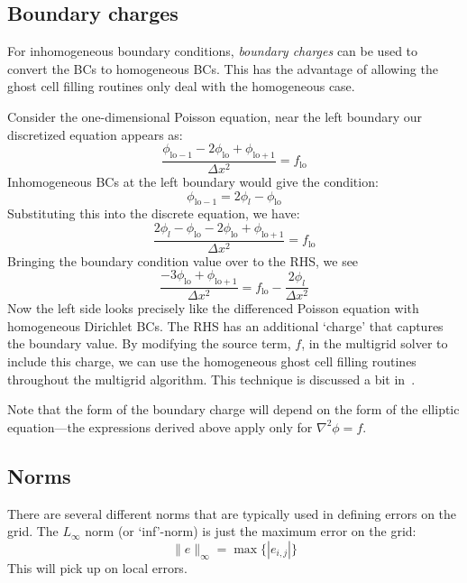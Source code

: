 \subsection{Boundary charges}

For inhomogeneous boundary conditions, {\em boundary charges} can be
used to convert the BCs to homogeneous BCs.  This has the advantage of
allowing the ghost cell filling routines only deal with the
homogeneous case.

Consider the one-dimensional Poisson equation, near the left boundary
our discretized equation appears as:
\begin{equation}
\frac{\phi_\mathrm{lo-1} - 2\phi_\mathrm{lo} + \phi_\mathrm{lo+1}}{\Delta x^2}
 = f_\mathrm{lo}
\end{equation}
Inhomogeneous BCs at the left boundary would give the condition:
\begin{equation}
\phi_\mathrm{lo-1} = 2 \phi_l - \phi_\mathrm{lo}
\end{equation}
Substituting this into the discrete equation, we have:
\begin{equation}
\frac{2 \phi_l - \phi_\mathrm{lo} - 2\phi_\mathrm{lo} + \phi_\mathrm{lo+1}}{\Delta x^2}
 = f_\mathrm{lo}
\end{equation}
Bringing the boundary condition value over to the RHS, we see
\begin{equation}
\frac{- 3\phi_\mathrm{lo} + \phi_\mathrm{lo+1}}{\Delta x^2}
 = f_\mathrm{lo} - \frac{2\phi_l}{\Delta x^2}
\end{equation}
Now the left side looks precisely like the differenced Poisson equation
with homogeneous Dirichlet BCs.  The RHS has an additional `charge' that
captures the boundary value.  By modifying the source term, $f$, in the
multigrid solver to include this charge, we can use the homogeneous 
ghost cell filling routines throughout the multigrid algorithm.
This technique is discussed a bit in~\cite{colellanotes}.

Note that the form of the boundary charge will depend on the form of the
elliptic equation---the expressions derived above apply only for
$\nabla^2 \phi = f$.


\subsection{Norms}

There are several different norms that are typically used in defining
errors on the grid.  The $L_\infty$ norm (or `inf'-norm) is just the
maximum error on the grid:
\begin{equation}
\|e\|_\infty = \max \{ |e_{i,j}| \}
\end{equation}
This will pick up on local errors.  

